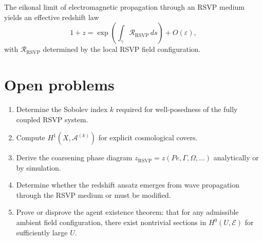 \begin{conjecture} \statusconjectured{}
  The eikonal limit of electromagnetic propagation through an
  RSVP medium yields an effective redshift law
  \[
    1 + z
    = \exp\!\left(\int_\gamma \mathcal{R}_{\mathrm{RSVP}}\, ds\right)
    + O(\varepsilon),
  \]
  with $\mathcal{R}_{\mathrm{RSVP}}$ determined by the local
  RSVP field configuration.
\end{conjecture}

\section{Open problems}

\begin{enumerate}[leftmargin=2em]
  \item \statusopen{} Determine the Sobolev index $k$ required
    for well-posedness of the fully coupled RSVP system.
  \item \statusopen{} Compute $H^1(X, \mathcal{A}^{(k)})$
    for explicit cosmological covers.
  \item \statusopen{} Derive the coarsening phase diagram
    $z_{\mathrm{RSVP}} = z(Pe, \Gamma, \Omega, \ldots)$
    analytically or by simulation.
  \item \statusopen{} Determine whether the redshift ansatz
    emerges from wave propagation through the RSVP medium or
    must be modified.
  \item \statusopen{} Prove or disprove the agent existence
    theorem: that for any admissible ambient field configuration,
    there exist nontrivial sections in $H^0(U, \mathcal{E})$
    for sufficiently large $U$.
\end{enumerate}
